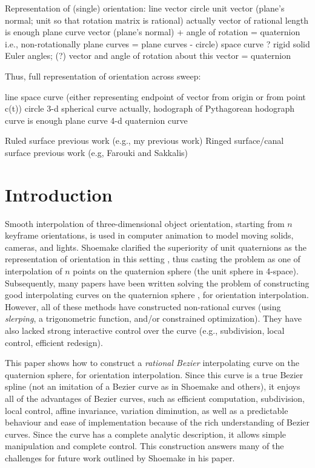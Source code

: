 {Representation of (single) orientation:
	line		vector
	circle		unit vector (plane's normal; 
				     unit so that rotation matrix is rational)
			actually vector of rational length is enough
	plane curve	vector (plane's normal) + angle of rotation = quaternion
				     i.e., non-rotationally plane curves = plane curves - circle)
	space curve	?
	rigid solid	Euler angles; (?) vector and angle of rotation about this vector = quaternion

Thus, full representation of orientation across sweep:

	line		space curve (either representing endpoint of vector from
				origin or from point c(t))
	circle		3-d spherical curve
			actually, hodograph of Pythagorean hodograph curve is enough
	plane curve	4-d quaternion curve


Ruled surface previous work (e.g., my previous work)
Ringed surface/canal surface previous work (e.g, Farouki and Sakkalis)
}

\clearpage

\section{Introduction}

Smooth interpolation of three-dimensional object orientation,
starting from $n$ keyframe orientations, is used in computer animation
to model moving solids, cameras, and lights.
Shoemake clarified the superiority of unit quaternions as the
representation of orientation in this setting \cite{shoemake85},
thus casting the problem as one of interpolation of $n$ points on
the quaternion sphere (the unit sphere in 4-space).
Subsequently, many papers have been written solving the problem of
constructing good interpolating curves on the quaternion sphere
\cite{shoemake85,duff85,gabriel85,pletinckx89,schlag91,barr92},
for orientation interpolation.
However, all of these methods have constructed non-rational curves
(using {\em slerping}, a trigonometric function, and/or
constrained optimization).
They have also lacked strong interactive control over the curve
(e.g., subdivision, local control, efficient redesign).

This paper shows how to construct
a {\em rational Bezier} interpolating curve on the
quaternion sphere, for orientation interpolation.
Since this curve is a true Bezier spline (not an imitation of a Bezier
curve as in Shoemake and others),
it enjoys all of the advantages of Bezier curves, such as efficient
computation, subdivision, local control, affine invariance, 
variation diminution, as well as a predictable behaviour and ease of 
implementation because of the rich understanding of Bezier curves.
Since the curve has a complete analytic description, it allows
simple manipulation and complete control.
This construction answers many of the challenges for future work
outlined by Shoemake in his paper.

